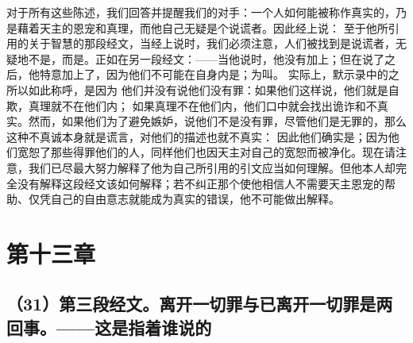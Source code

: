  对于所有这些陈述，我们回答并提醒我们的对手：一个人如何能被称作真实的，乃是藉着天主的恩宠和真理，而他自己无疑是个说谎者。因此经上说： 至于他所引用的关于智慧的那段经文，当经上说时，我们必须注意，人们被找到是说谎者，无疑地不是，而是。正如在另一段经文：——当他说时，他没有加上；但在说了之后，他特意加上了，因为他们不可能在自身内是；为叫。 实际上，默示录中的之所以如此称呼，是因为 他们并没有说他们没有罪：如果他们这样说，他们就是自欺，真理就不在他们内； 如果真理不在他们内，他们口中就会找出诡诈和不真实。然而，如果他们为了避免嫉妒，说他们不是没有罪，尽管他们是无罪的，那么这种不真诚本身就是谎言，对他们的描述也就不真实： 因此他们确实是；因为他们宽恕了那些得罪他们的人，同样他们也因天主对自己的宽恕而被净化。现在请注意，我们已尽最大努力解释了他为自己所引用的引文应当如何理解。但他本人却完全没有解释这段经文该如何解释；若不纠正那个使他相信人不需要天主恩宠的帮助、仅凭自己的自由意志就能成为真实的错误，他不可能做出解释。\par


\section{第十三章}


\subsection{（31）第三段经文。离开一切罪与已离开一切罪是两回事。——这是指着谁说的}

